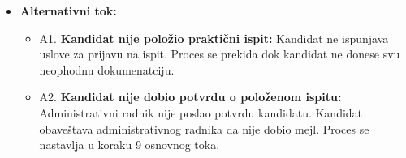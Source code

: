 \begin{itemize}
\begin{enumerate}
   \end{enumerate}

\item \textbf{Alternativni tok:}  
   \begin{itemize}
   \item A1. \textbf{Kandidat nije položio praktični ispit:}
  Kandidat ne ispunjava uslove za prijavu na ispit. Proces se prekida dok kandidat ne donese svu neophodnu dokumenatciju.
  \item A2. \textbf{Kandidat nije dobio potvrdu o položenom ispitu:}
  Administrativni radnik nije poslao potvrdu kandidatu. Kandidat obaveštava administrativnog radnika da nije dobio mejl. Proces se nastavlja u koraku 9 osnovnog toka.
   \end{itemize}

\end{itemize}  
